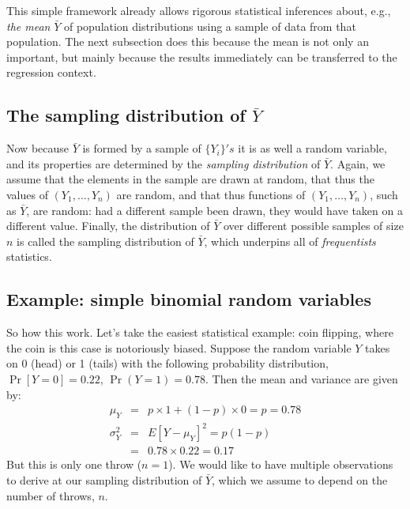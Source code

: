 \documentclass[
]{book}
\begin{document}
This simple framework already allows rigorous statistical inferences about, e.g., \emph{the mean} \(\bar{Y}\) of population distributions using a sample of data from that population. The next subsection does this because the mean is not only an important, but mainly because the results immediately can be transferred to the regression context.

\hypertarget{the-sampling-distribution-of-bary}{%
\subsection{\texorpdfstring{The sampling distribution of \(\bar{Y}\)}{The sampling distribution of \textbackslash bar\{Y\}}}\label{the-sampling-distribution-of-bary}}

Now because \(\bar{Y}\) is formed by a sample of \(\{Y_i\}'s\) it is as well a random variable, and its properties are determined by the \emph{sampling distribution} of \(\bar{Y}\). Again, we assume that the elements in the sample are drawn at random, that thus the values of \((Y_1,\ldots, Y_n)\) are random, and that thus functions of \((Y_1,\ldots, Y_n)\), such as \(\bar{Y}\), are random: had a different sample been drawn, they would have taken on a different value. Finally, the distribution of \(\bar{Y}\) over different possible samples of size \(n\) is called the sampling distribution of \(\bar{Y}\), which underpins all of \emph{frequentists} statistics.

\hypertarget{example-simple-binomial-random-variables}{%
\subsection{Example: simple binomial random variables}\label{example-simple-binomial-random-variables}}

So how this work. Let's take the easiest statistical example: coin flipping, where the coin is this case is notoriously biased. Suppose the random variable \(Y\) takes on 0 (head) or 1 (tails) with the following probability distribution, \(\Pr[Y = 0] = 0.22\), \(\Pr(Y =1) = 0.78\). Then the mean and variance are given by:
\begin{eqnarray} 
\mu_{Y} &=& p \times 1 + (1-  p) \times 0 = p = 0.78\\
\sigma^2_Y&=& E[Y - \mu_{Y}]^2 = p(1 - p) \\
&=& 0.78 \times 0.22 = 0.17
\end{eqnarray}
But this is only one throw (\(n= 1\)). We would like to have multiple observations to derive at our sampling distribution of \(\bar{Y}\), which we assume to depend on the number of throws, \(n\).
\end{document}
